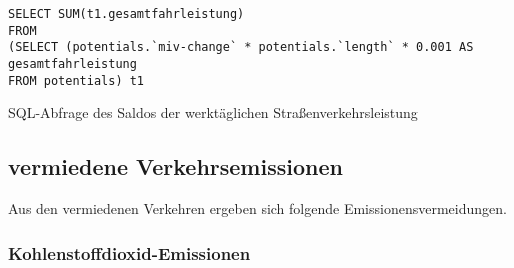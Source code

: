 \documentclass[fontsize=12pt,a4paper]{scrreprt}
\begin{document}
\begin{listing}[htbp]
\begin{verbatim}
SELECT SUM(t1.gesamtfahrleistung)  
FROM
(SELECT (potentials.`miv-change` * potentials.`length` * 0.001 AS gesamtfahrleistung
FROM potentials) t1
\end{verbatim}
\caption{SQL-Abfrage des Saldos der werktäglichen Straßenverkehrsleistung}\label{lst-neu-werktaeglich}
\end{listing}

\subsection{vermiedene Verkehrsemissionen}

Aus den vermiedenen Verkehren ergeben sich folgende Emissionensvermeidungen.

\subsubsection{Kohlenstoffdioxid-Emissionen}
\end{document}
